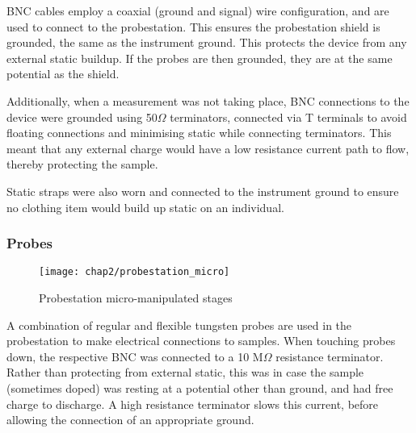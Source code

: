 \documentclass[../../Matt_Gebert_Honours_Thesis.tex]{subfiles}
\begin{document}
	BNC cables employ a coaxial (ground and signal) wire configuration, and are used to connect to the probestation. This ensures the probestation shield is grounded, the same as the instrument ground. This protects the device from any external static buildup. If the probes are then grounded, they are at the same potential as the shield.
	
	Additionally, when a measurement was not taking place, BNC connections to the device were grounded using 50$\Omega$ terminators, connected via T terminals to avoid floating connections and minimising static while connecting terminators. This meant that any external charge would have a low resistance current path to flow, thereby protecting the sample. 
	
	Static straps were also worn and connected to the instrument ground to ensure no clothing item would build up static on an individual.
		
	\subsubsection{Probes}
	\begin{wrapfigure}[12]{r}[0pt]{5.5cm}
		\vspace{-1cm}
		\centering
		\texttt{[image: chap2/probestation\_micro]}
		\caption{Probestation micro-manipulated stages}\label{fig:probestation_micro}
	\end{wrapfigure}
	A combination of regular and flexible tungsten probes are used in the probestation to make electrical connections to samples. 
	When touching probes down, the respective BNC was connected to a 10 M$\Omega$ resistance terminator. Rather than protecting from external static, this was in case the sample (sometimes doped) was resting at a potential other than ground, and had free charge to discharge. A high resistance terminator slows this current, before allowing the connection of an appropriate ground.
	
	
\end{document}
